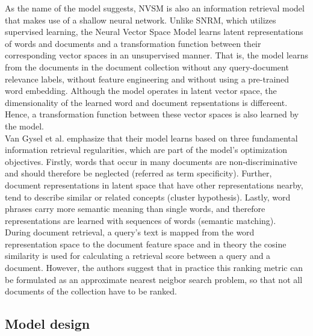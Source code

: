 As the name of the model suggests, NVSM is also an information
    retrieval model that makes use of a shallow neural network.
Unlike SNRM, which utilizes supervised learning, the 
    Neural Vector Space Model learns latent representations
    of words and documents and a
    transformation function between their corresponding 
    vector spaces
    in an unsupervised manner.
That is, the model learns from the documents in the document 
    collection without any query-document relevance labels, 
    without feature engineering and
    without using a pre-trained word embedding.
Although the model operates in latent vector space,
    the dimensionality of the learned word and document
    repsentations is differeent.
Hence, a transformation function between these vector spaces
    is also learned by the model.\\
Van Gysel et al. emphasize that their model learns based on
    three fundamental information retrieval regularities, 
    which are part of the model's optimization objectives.
Firstly, words that occur in many documents are non-discriminative
    and should therefore be neglected (referred as term specificity).
Further, document representations in latent space that have 
    other representations nearby, tend to describe
    similar or related concepts (cluster hypothesis).
Lastly, word phrases carry more semantic
    meaning than single words, and therefore representations
    are learned with sequences of words (semantic matching).\\
During document retrieval, a query's text is mapped
    from the word representation space to the document feature
    space and in theory the cosine similarity is used 
    for calculating a retrieval score between a query and
    a document.
However, the authors suggest that in practice this ranking 
    metric can be formulated as an approximate nearest neigbor 
    search problem, so that not all documents of the collection
    have to be ranked. \cite{van-gysel:2017:neural-vector-spaces}

\subsection*{Model design}


